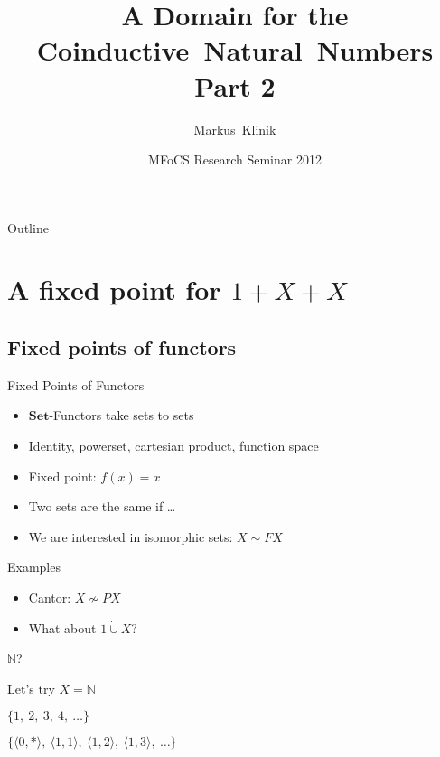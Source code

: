 \documentclass{beamer}
\title
{A Domain for the\\
Coinductive~Natural~Numbers\\
Part 2}
\author
{Markus~Klinik}
\institute[Radboud University Nijmegen] %
{
  Radboud University Nijmegen
}
\date
{MFoCS Research Seminar 2012}
\begin{document}
\begin{frame}
  \titlepage
\end{frame}

\begin{frame}{Outline}
  \tableofcontents
\end{frame}

\section{A fixed point for $1+X+X$}

\subsection{Fixed points of functors}

\begin{frame}{Fixed Points of Functors}

\begin{itemize}[<+->]
  \item $\mathbf{Set}$-Functors take sets to sets
  \item Identity, powerset, cartesian product, function space
  \item Fixed point: $f(x) = x$
  \item Two sets are the same if \ldots
  \item We are interested in isomorphic sets:
      $X \sim FX$
\end{itemize}

\end{frame}


\begin{frame}{Examples}

\begin{itemize}[<+->]
  \item Cantor: $X \nsim PX$
  \item What about $1 \dot\cup X$?
\end{itemize}

\end{frame}


\begin{frame}{$\mathbb{N}$?}

Let's try $X = \mathbb{N}$

\begin{center}

$\{1,\ 2,\ 3,\ 4,\ \ldots \}$

\bigskip

$\{\langle 0, * \rangle
,\ \langle 1, 1 \rangle
,\ \langle 1, 2 \rangle
,\ \langle 1, 3 \rangle
,\ \ldots
\}$

\end{center}

\end{frame}
\end{document}

